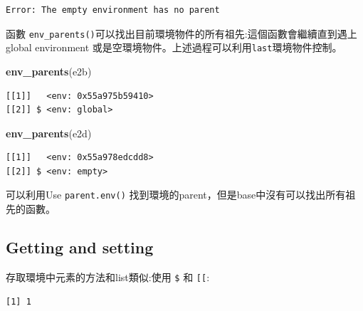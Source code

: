 \documentclass[]{book}
\newenvironment{Shaded}{\begin{snugshade}}{\end{snugshade}}
\newcommand{\DataTypeTok}[1]{\textcolor[rgb]{0.13,0.29,0.53}{#1}}
\newcommand{\DecValTok}[1]{\textcolor[rgb]{0.00,0.00,0.81}{#1}}
\newcommand{\KeywordTok}[1]{\textcolor[rgb]{0.13,0.29,0.53}{\textbf{#1}}}
\newcommand{\NormalTok}[1]{#1}
\newcommand{\OperatorTok}[1]{\textcolor[rgb]{0.81,0.36,0.00}{\textbf{#1}}}
\newcommand{\StringTok}[1]{\textcolor[rgb]{0.31,0.60,0.02}{#1}}
\theoremstyle{definition}
\theoremstyle{definition}
\theoremstyle{definition}
\theoremstyle{remark}
\begin{document}
\begin{verbatim}
Error: The empty environment has no parent
\end{verbatim}

函數
\texttt{env\_parents()}可以找出目前環境物件的所有祖先:這個函數會繼續直到遇上global
environment 或是空環境物件。上述過程可以利用\texttt{last}環境物件控制。

\begin{Shaded}
\begin{Highlighting}[]
\KeywordTok{env_parents}\NormalTok{(e2b)}
\end{Highlighting}
\end{Shaded}

\begin{verbatim}
[[1]]   <env: 0x55a975b59410>
[[2]] $ <env: global>
\end{verbatim}

\begin{Shaded}
\begin{Highlighting}[]
\KeywordTok{env_parents}\NormalTok{(e2d)}
\end{Highlighting}
\end{Shaded}

\begin{verbatim}
[[1]]   <env: 0x55a978edcdd8>
[[2]] $ <env: empty>
\end{verbatim}

可以利用Use \texttt{parent.env()}
找到環境的parent，但是base中沒有可以找出所有祖先的函數。

\hypertarget{getting-and-setting}{%
\subsection{Getting and setting}\label{getting-and-setting}}

存取環境中元素的方法和list類似:使用 \texttt{\$} 和 \texttt{{[}{[}}:

\begin{Shaded}
\end{Shaded}

\begin{verbatim}
[1] 1
\end{verbatim}

\begin{Shaded}
\end{Shaded}
\end{document}
